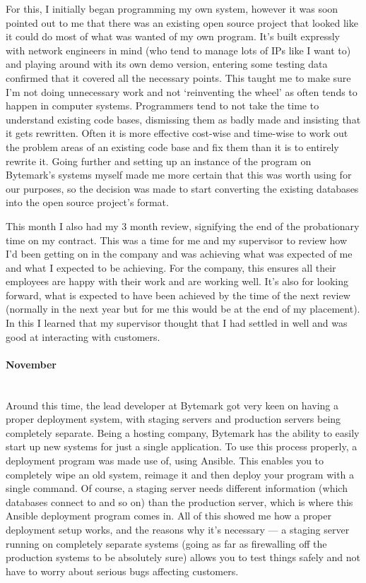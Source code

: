\documentclass[12pt,a4paper]{article}
\newcommand{\paragraphnl}[1]{\paragraph{#1}\mbox{}\\}
\begin{document}
	For this, I initially began programming my own system, however it was soon
	pointed out to me that there was an existing open source project that
	looked like it could do most of what was wanted of my own program. It's
	built expressly with network engineers in mind (who tend to manage lots of
	IPs like I want to) and playing around with its own demo version, entering
	some testing data confirmed that it covered all the necessary points. This
	taught me to make sure I'm not doing unnecessary work and not `reinventing
	the wheel' as often tends to happen in computer systems. Programmers tend
	to not take the time to understand existing code bases, dismissing them as
	badly made and insisting that it gets rewritten. Often it is more effective
	cost-wise and time-wise to work out the problem areas of an existing code
	base and fix them than it is to entirely rewrite it. Going further and
	setting up an instance of the program on Bytemark's systems myself made me
	more certain that this was worth using for our purposes, so the decision
	was made to start converting the existing databases into the open source
	project's format.

	This month I also had my 3 month review, signifying the end of the
	probationary time on my contract. This was a time for me and my supervisor
	to review how I'd been getting on in the company and was achieving what was
	expected of me and what I expected to be achieving. For the company, this
	ensures all their employees are happy with their work and are working well.
	It's also for looking forward, what is expected to have been achieved by
	the time of the next review (normally in the next year but for me this
	would be at the end of my placement). In this I learned that my supervisor
	thought that I had settled in well and was good at interacting with
	customers.

\paragraphnl{November}
	Around this time, the lead developer at Bytemark got very keen on having a
	proper deployment system, with staging servers and production servers
	being completely separate. Being a hosting company, Bytemark has the
	ability to easily start up new systems for just a single application. To
	use this process properly, a deployment program was made use of, using
	Ansible. This enables you to completely wipe an old system, reimage it and
	then deploy your program with a single command. Of course, a staging server
	needs different information (which databases connect to and so on) than the
	production server, which is where this Ansible deployment program comes in.
	All of this showed me how a proper deployment setup works, and the reasons
	why it's necessary --- a staging server running on completely separate
	systems (going as far as firewalling off the production systems to be
	absolutely sure) allows you to test things safely and not have to worry
	about serious bugs affecting customers.
\end{document}
